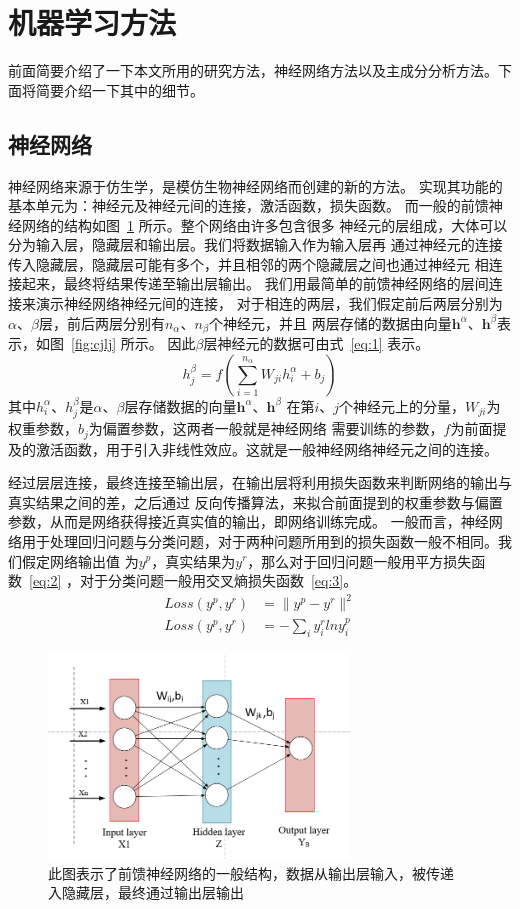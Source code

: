 \documentclass[aps,pre,12pt,preprint,onecolumn,showpacs,showkeys]{revtex4-1}
\begin{document}
\section{机器学习方法} 
前面简要介绍了一下本文所用的研究方法，神经网络方法以及主成分分析方法。下面将简要介绍一下其中的细节。
\subsection{神经网络}
神经网络来源于仿生学，是模仿生物神经网络而创建的新的方法。
实现其功能的基本单元为：神经元及神经元间的连接，激活函数，损失函数。
而一般的前馈神经网络的结构如图~\ref{fig:cnn} 所示。整个网络由许多包含很多
神经元的层组成，大体可以分为输入层，隐藏层和输出层。我们将数据输入作为输入层再
通过神经元的连接传入隐藏层，隐藏层可能有多个，并且相邻的两个隐藏层之间也通过神经元
相连接起来，最终将结果传递至输出层输出。
我们用最简单的前馈神经网络的层间连接来演示神经网络神经元间的连接，
对于相连的两层，我们假定前后两层分别为
$\alpha$、$\beta$层，前后两层分别有$n_{\alpha}$、$n_{\beta}$个神经元，并且
两层存储的数据由向量$\bm h^{\alpha}$、$\bm h^{\beta}$表示，如图~\ref{fig:cjlj} 所示。
因此$\beta$层神经元的数据可由式~\ref{eq:1} 表示。
\begin{equation}
h_{j}^{\beta}=f(\sum_{i=1}^{n_{\alpha}}W_{ji}h_{i}^{\alpha}+b_{j}) \label{eq:1}
\end{equation}
其中$h_{i}^{\alpha}$、$h_{j}^{\beta}$是$\alpha$、$\beta$层存储数据的向量$\bm h^{\alpha}$、$\bm h^{\beta}$
在第$i$、$j$个神经元上的分量，$W_{ji}$为权重参数，$b_{j}$为偏置参数，这两者一般就是神经网络
需要训练的参数，$f$为前面提及的激活函数，用于引入非线性效应。这就是一般神经网络神经元之间的连接。\par
经过层层连接，最终连接至输出层，在输出层将利用损失函数来判断网络的输出与真实结果之间的差，之后通过
反向传播算法，来拟合前面提到的权重参数与偏置参数，从而是网络获得接近真实值的输出，即网络训练完成。
一般而言，神经网络用于处理回归问题与分类问题，对于两种问题所用到的损失函数一般不相同。我们假定网络输出值
为$y^{p}$，真实结果为$y^{r}$，那么对于回归问题一般用平方损失函数~\ref{eq:2} ，对于分类问题一般用交叉熵损失函数~\ref{eq:3}。
\begin{align}
Loss(y^{p},y^{r})&=\|y^{p}-y^{r}\|^{2} \label{eq:2} \\
Loss(y^{p},y^{r})&=-\sum_{i}y_{i}^{r}lny_{i}^{p} \label{eq:3}
\end{align}
\par
\begin{figure}[t]
\centering
\includegraphics[width=80mm]{CNN}
\caption{\label{fig:cnn}%
此图表示了前馈神经网络的一般结构，数据从输出层输入，被传递
入隐藏层，最终通过输出层输出}
\end{figure}
\end{document}
